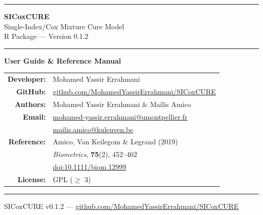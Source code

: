 \documentclass[12pt,a4paper]{article}
\begin{document}

\begin{titlepage}
  \centering
  \vspace*{2cm}

  {\color{bleu}\rule{\linewidth}{2pt}}
  \vspace{0.5cm}

  {\Huge\bfseries\color{bleu} SICoxCURE}\\[0.3cm]
  {\Large\color{bleu2} Single-Index/Cox Mixture Cure Model}\\[0.2cm]
  {\large\color{black} R Package --- Version 0.1.2}

  \vspace{0.3cm}
  {\color{bleu}\rule{\linewidth}{2pt}}

  \vspace{1.5cm}

  {\large\textbf{User Guide \& Reference Manual}}

  \vspace{2cm}

  \begin{center}
\begin{tabular}{rl}
    \textbf{Developer:}   & Mohamed Yassir Errahmani \\[0.2cm]
    \textbf{GitHub:}      & \href{https://github.com/MohamedYassirErrahmani/SICoxCURE}
                            {github.com/MohamedYassirErrahmani/SICoxCURE} \\[0.5cm]
    \textbf{Authors:}     & Mohamed Yassir Errahmani \& Maïlis Amico \\[0.2cm]
    \textbf{Email:}       & \href{mailto:mohamed-yassir.errahmani@umontpellier.fr}
                            {mohamed-yassir.errahmani@umontpellier.fr} \\
                          & \href{mailto:mailis.amico@kuleuven.be}
                            {mailis.amico@kuleuven.be} \\[0.5cm]
    \textbf{Reference:}   & Amico, Van Keilegom \& Legrand (2019) \\
                          & \textit{Biometrics}, \textbf{75}(2), 452--462 \\
                          & \href{https://doi.org/10.1111/biom.12999}
                            {doi:10.1111/biom.12999} \\[0.5cm]
    \textbf{License:}     & GPL ($\geq$ 3)
  \end{tabular}
  \end{center}

  \vfill

  {\color{bleu}\rule{\linewidth}{1pt}}
  {\small\color{gris2} SICoxCURE v0.1.2 ---
   \href{https://github.com/MohamedYassirErrahmani/SICoxCURE}
   {github.com/MohamedYassirErrahmani/SICoxCURE}}
\end{titlepage}
\end{document}

